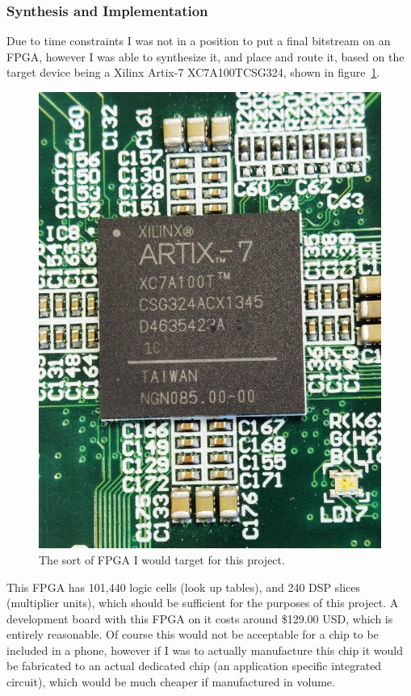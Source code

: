 \documentclass[12pt]{article}
\begin{document}
\subsubsection{Synthesis and Implementation}

Due to time constraints I was not in a position to put a final bitstream on an FPGA, however I was able to synthesize it, and place and route it, based on the target device being a Xilinx Artix-7 XC7A100TCSG324, shown in figure~\ref{tim_xilinx}.

\begin{figure}[thp]
	\centering
	
	\includegraphics[width=\textwidth]{tim_xilinx.jpg}
	
	\caption{The sort of FPGA I would target for this project.}
	\label{tim_xilinx}
\end{figure}

This FPGA has 101,440 logic cells (look up tables), and 240 DSP slices (multiplier units), which should be sufficient for the purposes of this project. A development board with this FPGA on it costs around \$129.00 USD, which is entirely reasonable. Of course this would not be acceptable for a chip to be included in a phone, however if I was to actually manufacture this chip it would be fabricated to an actual dedicated chip (an application specific integrated circuit), which would be much cheaper if manufactured in volume.
\end{document}
